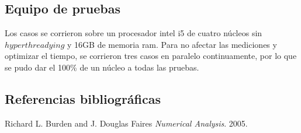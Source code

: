 \subsection{Equipo de pruebas}
Los casos se corrieron sobre un procesador intel i5 de cuatro n\'ucleos sin $hyperthreadying$ y 16GB de memoria ram. Para no afectar las mediciones y optimizar el tiempo, se corrieron tres casos en paralelo continuamente, por lo que se pudo dar el 100\% de un n\'ucleo a todas las pruebas.

\subsection{Referencias bibliogr\'aficas}
\begin{thebibliography}{9}

  Richard L. Burden and J. Douglas Faires
  \emph{Numerical Analysis}.
  2005.
\end{thebibliography}
